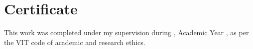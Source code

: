 \chapter*{Certificate}
This work was completed under my supervision during \semester, Academic Year \academicyear, as per the VIT code of academic and research ethics.
